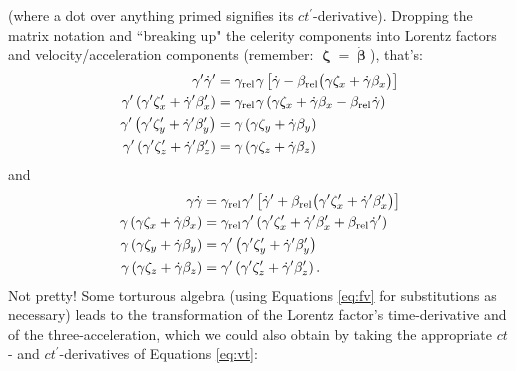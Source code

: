 \documentclass[12pt]{article}
\newcommand{\vvbeta}{\bm{\upbeta}}
\newcommand{\vvzeta}{\bm{\upzeta}}
\begin{document}
(where a dot over anything primed signifies its $ct^\prime$-derivative). Dropping the matrix notation and ``breaking up" the celerity components into Lorentz factors and velocity/acceleration components (remember: $\vvzeta = \dot{\vvbeta}$), that's:
\begin{equation*}
\begin{aligned}
\gamma^\prime \dot{\gamma}^\prime &= \gamma_{\textrm{rel}} \mkern1mu \gamma \left[ \dot{\gamma} - \beta_{\textrm{rel}} \bigl( \gamma \zeta_x + \dot{\gamma} \beta_x \bigr) \right] \\
\gamma^\prime \left( \gamma^{\prime} \zeta^{\prime}_x + \dot{\gamma}^\prime \beta_x^\prime \right) &= \gamma_{\textrm{rel}} \mkern1mu \gamma \left( \gamma \zeta_x + \dot{\gamma} \beta_x - \beta_{\textrm{rel}} \mkern1mu \dot{\gamma} \right) \\
\gamma^\prime \left( \gamma^{\prime} \zeta^{\prime}_y + \dot{\gamma}^\prime \beta_y^\prime \right) &= \gamma \left( \gamma \zeta_y + \dot{\gamma} \beta_y \right) \\
\gamma^\prime \left( \gamma^{\prime} \zeta^{\prime}_z + \dot{\gamma}^\prime \beta_z^\prime \right) &= \gamma \left( \gamma \zeta_z +  \dot{\gamma} \beta_z \right)
\end{aligned}
\end{equation*}
and
\begin{equation*}
\begin{aligned}
\gamma \dot{\gamma} &= \gamma_{\textrm{rel}} \mkern1mu \gamma^\prime \left[ \dot{\gamma}^\prime + \beta_{\textrm{rel}} \bigl( \gamma^{\prime} \zeta^\prime_x +  \dot{\gamma}^\prime \beta^\prime_x \bigr) \right] \\
\gamma \left( \gamma \zeta_x + \dot{\gamma} \beta_x \right) &= \gamma_{\textrm{rel}} \mkern1mu \gamma^\prime \left( \gamma^{\prime} \zeta^\prime_x + \dot{\gamma}^\prime \beta^\prime_x + \beta_{\textrm{rel}} \mkern1mu \dot{\gamma}^\prime \right) \\
\gamma \left( \gamma \zeta_y + \dot{\gamma} \beta_y \right) &= \gamma^\prime \left( \gamma^{\prime} \zeta^{\prime}_y + \dot{\gamma}^\prime \beta_y^\prime \right) \\
\gamma \left( \gamma \zeta_z +  \dot{\gamma} \beta_z \right) &= \gamma^\prime \left( \gamma^{\prime} \zeta^{\prime}_z + \dot{\gamma}^\prime \beta_z^\prime \right) .
\end{aligned}
\end{equation*}
Not pretty! Some torturous algebra (using Equations \ref{eq:fv} for substitutions as necessary) leads to the transformation of the Lorentz factor's time-derivative and of the three-acceleration, which we could also obtain by taking the appropriate $ct$- and $ct^\prime$-derivatives of Equations \ref{eq:vt}:
\end{document}
